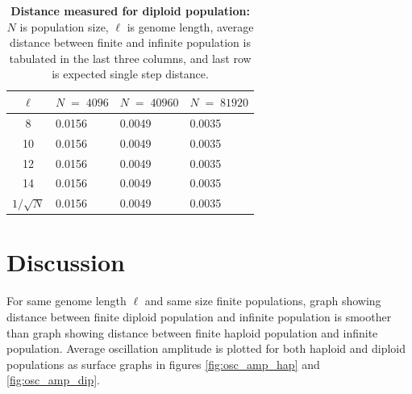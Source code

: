
\clearpage
\begin{table}[!h]
\caption[\textbf{Distance measured for diploid population}]{\textbf{Distance measured for diploid population:} $N$ is population size, $\ell$ is genome length, 
average distance between finite and infinite population is tabulated in the last three columns, and last row is expected single step distance.}
\centering
\begin{tabularx}{0.75\textwidth}{ c *{3}{X}}
\toprule
$\ell$ & $N \;=\; 4096 $ & $N \;=\; 40960 $ & $N \;=\; 81920 $\\
\midrule
8 & 0.0156 & 0.0049 & 0.0035 \\
10 & 0.0156 & 0.0049 & 0.0035 \\
12 & 0.0156 & 0.0049 & 0.0035 \\
14 & 0.0156 & 0.0049 & 0.0035 \\
\midrule
$1/\sqrt{N}$ & 0.0156 & 0.0049 & 0.0035 \\
\bottomrule
\end{tabularx}
\label{tableDistanceOscDip}
\end{table}

\section{Discussion}
For same genome length $\ell$ and same size finite populations, graph showing distance between finite diploid population and infinite population is 
smoother than graph showing distance between finite haploid population and infinite population. Average oscillation amplitude is 
plotted for both haploid and diploid populations as surface graphs in figures \ref{fig:osc_amp_hap} and \ref{fig:osc_amp_dip}.

